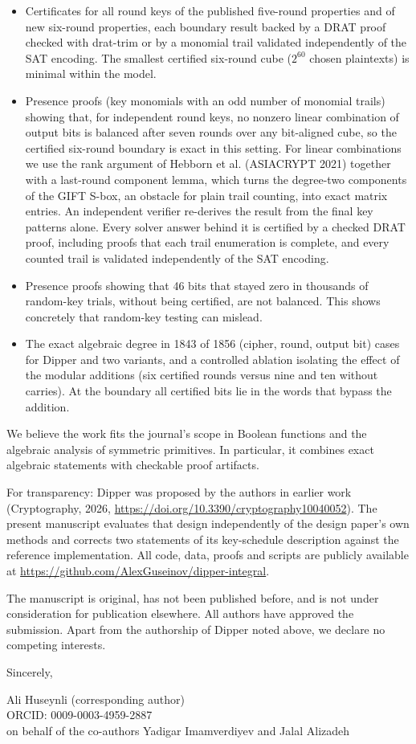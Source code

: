 \documentclass[10pt,a4paper]{article}
\begin{document}
\begin{itemize}\setlength\itemsep{3pt}
\item Certificates for all round keys of the published five-round properties and of new six-round properties, each boundary result backed by a DRAT proof checked with drat-trim or by a monomial trail validated independently of the SAT encoding. The smallest certified six-round cube ($2^{60}$ chosen plaintexts) is minimal within the model.
\item Presence proofs (key monomials with an odd number of monomial trails) showing that, for independent round keys, no nonzero linear combination of output bits is balanced after seven rounds over any bit-aligned cube, so the certified six-round boundary is exact in this setting. For linear combinations we use the rank argument of Hebborn et al. (ASIACRYPT 2021) together with a last-round component lemma, which turns the degree-two components of the GIFT S-box, an obstacle for plain trail counting, into exact matrix entries. An independent verifier re-derives the result from the final key patterns alone. Every solver answer behind it is certified by a checked DRAT proof, including proofs that each trail enumeration is complete, and every counted trail is validated independently of the SAT encoding.
\item Presence proofs showing that 46 bits that stayed zero in thousands of random-key trials, without being certified, are not balanced. This shows concretely that random-key testing can mislead.
\item The exact algebraic degree in 1843 of 1856 (cipher, round, output bit) cases for Dipper and two variants, and a controlled ablation isolating the effect of the modular additions (six certified rounds versus nine and ten without carries). At the boundary all certified bits lie in the words that bypass the addition.
\end{itemize}

We believe the work fits the journal's scope in Boolean functions and the algebraic analysis of symmetric primitives. In particular, it combines exact algebraic statements with checkable proof artifacts.

For transparency: Dipper was proposed by the authors in earlier work (Cryptography, 2026, \url{https://doi.org/10.3390/cryptography10040052}). The present manuscript evaluates that design independently of the design paper's own methods and corrects two statements of its key-schedule description against the reference implementation. All code, data, proofs and scripts are publicly available at \url{https://github.com/AlexGuseinov/dipper-integral}.

The manuscript is original, has not been published before, and is not under consideration for publication elsewhere. All authors have approved the submission. Apart from the authorship of Dipper noted above, we declare no competing interests.

Sincerely,

Ali Huseynli (corresponding author)\\
ORCID: 0009-0003-4959-2887\\
on behalf of the co-authors Yadigar Imamverdiyev and Jalal Alizadeh
\end{document}
